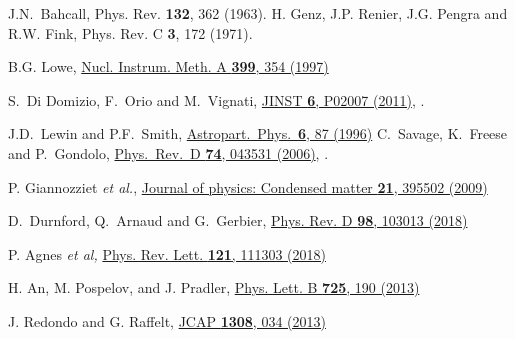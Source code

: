 \begin{thebibliography}{100}
J.N.~Bahcall, 
Phys. Rev. {\bf 132}, 362 (1963).
H. Genz, J.P. Renier, J.G. Pengra and R.W. Fink,
Phys. Rev. C {\bf 3}, 172 (1971).

  B.G. Lowe, 
  \href{\DOI/10.1016/S0168-9002(97)00965-0}{Nucl. Instrum. Meth. A {\bf 399}, 354 (1997)}

S.~Di Domizio, F.~Orio and M.~Vignati,
  \href{\DOI/10.1088/1748-0221/6/02/P02007}{JINST {\bf 6}, P02007 (2011)}, .





J.D.~Lewin and P.F.~Smith, 
\href{\DOI/10.1016/S0927-6505(96)00047-3}{Astropart.\ Phys.\ {\bf 6}, 87 (1996)}
C.~Savage, K.~Freese and P.~Gondolo, 
\href{\DOI/10.1103/PhysRevD.74.043531}{Phys.\ Rev.\ D {\bf 74}, 043531 (2006)}, .

 P. Giannozziet {\it et al.}, 
 \href{\DOI/10.1088/0953-8984/21/39/395502}{Journal of physics: Condensed matter {\bf21}, 395502 (2009)} 

  
    D.~Durnford, Q.~Arnaud and G.~Gerbier,
 \href{\DOI/10.1103/PhysRevD.98.103013}{Phys. Rev. D {\bf 98}, 103013 (2018)} 



  P. Agnes {\it et al,}
  \href{\DOI/10.1103/PhysRevLett.121.111303}{Phys. Rev. Lett. {\bf 121}, 111303 (2018)} 
  

  
  H. An, M. Pospelov, and J. Pradler,
   \href{\DOI/10.1016/j.physletb.2013.07.008}{Phys. Lett. B {\bf725}, 190 (2013)} 
   
J. Redondo and G. Raffelt, 
   \href{\DOI/10.1088/1475-7516/2013/08/034}{JCAP {\bf1308}, 034 (2013)} 




\end{thebibliography}
